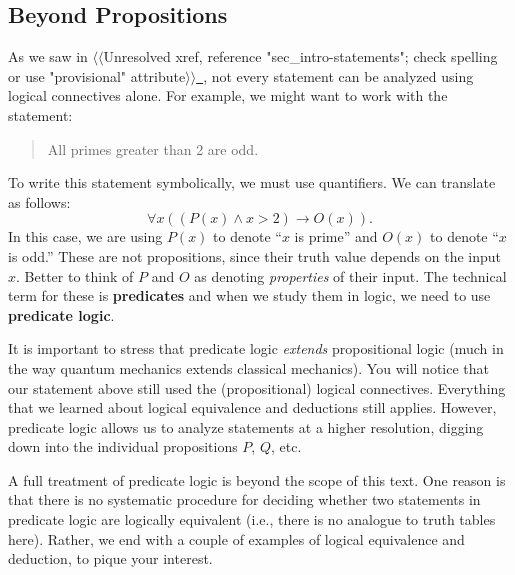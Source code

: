 \documentclass[10pt,]{book}
\newcommand{\terminology}[1]{\textbf{#1}}
\theoremstyle{plain}
\theoremstyle{definition}
\theoremstyle{definition}
\theoremstyle{definition}
\theoremstyle{definition}
\numberwithin{equation}{chapter}
\def\imp{\rightarrow}
\newcommand{\gt}{>}
\begin{document}
\subsection[{Beyond Propositions}]{Beyond Propositions}\label{subsection-38}
\hypertarget{p-1843}{}%
As we saw in {$\langle\langle$Unresolved xref, reference "sec\_intro-statements"; check spelling or use "provisional" attribute$\rangle\rangle$}\hyperlink{}{~}, not every statement can be analyzed using logical connectives alone.  For example, we might want to work with the statement:%
\begin{quote}\hypertarget{blockquote-12}{}
\hypertarget{p-1844}{}%
All primes greater than 2 are odd.%
\end{quote}
\hypertarget{p-1845}{}%
To write this statement symbolically, we must use quantifiers.  We can translate as follows:%
\begin{equation*}
\forall x ((P(x) \wedge x \gt 2) \imp O(x)).
\end{equation*}
In this case, we are using \(P(x)\) to denote ``\(x\) is prime'' and \(O(x)\) to denote ``\(x\) is odd.''  These are not propositions, since their truth value depends on the input \(x\).  Better to think of \(P\) and \(O\) as denoting \emph{properties} of their input.  The technical term for these is \terminology{predicates} and when we study them in logic, we need to use \terminology{predicate logic}.%
\par
\hypertarget{p-1846}{}%
It is important to stress that predicate logic \emph{extends} propositional logic (much in the way quantum mechanics extends classical mechanics).  You will notice that our statement above still used the (propositional) logical connectives.  Everything that we learned about logical equivalence and deductions still applies.  However, predicate logic allows us to analyze statements at a higher resolution, digging down into the individual propositions \(P\), \(Q\), etc.%
\par
\hypertarget{p-1847}{}%
A full treatment of predicate logic is beyond the scope of this text.  One reason is that there is no systematic procedure for deciding whether two statements in predicate logic are logically equivalent (i.e., there is no analogue to truth tables here).  Rather, we end with a couple of examples of logical equivalence and deduction, to pique your interest.%
\end{document}
